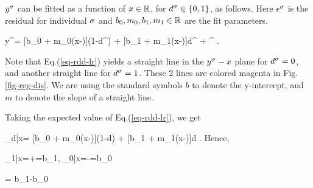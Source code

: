 $y^\sigma$
can be fitted
as a function of $x\in { \mathbb{R}}$,
for $d^\sigma \in \{0,1\}$,
 as follows.
Here $\epsilon^\sigma$
is the residual
for individual $\sigma$
and $b_0, m_0, b_1, m_1\in { \mathbb{R}}$
are the fit parameters.

\beq
y^\s = [b_0 + m_0(x-\xi)](1-d^\s)
+  [b_1 + m_1(x-\xi)]d^\s
+ \eps^\s
\;.
\label{eq-rdd-lr}
\eeq

Note that Eq.(\ref{eq-rdd-lr})
 yields a straight line
in the $y^\sigma-x$ plane
for $d^\sigma=0$,
and another 
straight line for $d^\sigma=1$.
These 2 lines are 
colored magenta in Fig.\ref{fig-reg-dis}.
We are
using the
standard symbols
$b$ to denote
the y-intercept, and $m$ 
to denote the slope
of a straight line.

Taking the expected value
of Eq.(\ref{eq-rdd-lr}), we get

\beq
\caly_{d|x}=
[b_0 + m_0(x-\xi)](1-d)
+  [b_1 + m_1(x-\xi)]d
\;.
\eeq
Hence,

\beq
\caly_{1|x=\xi+}=b_1\;,\;\;
\caly_{0|x=\xi-}=b_0
\eeq

\beq
\delta= b_1-b_0
\eeq

